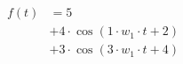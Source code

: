 \begin{center}
\begin{align*}
f(t)
&= 5 \\
&+ 4 \cdot \cos( 1 \cdot w_1 \cdot t + 2) \\
&+ 3 \cdot \cos( 3 \cdot w_1 \cdot t + 4)
\end{align*}
\end{center}
